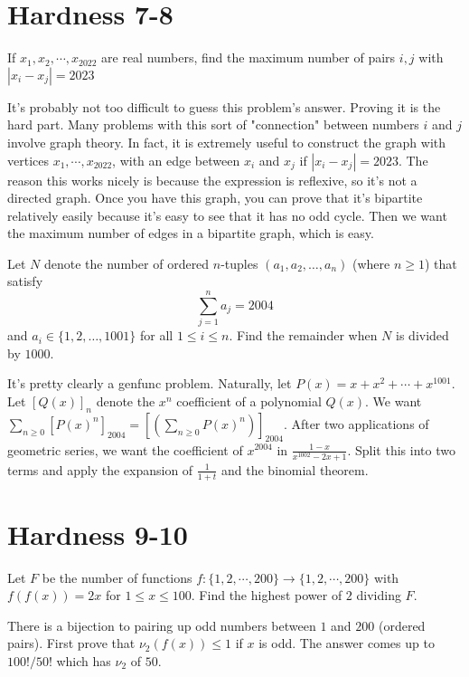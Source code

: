 \documentclass[11pt]{scrartcl}
\begin{document}
\section{Hardness 7-8}
\begin{example}
  If $x_1, x_2, \cdots, x_{2022}$ are real numbers, find the maximum number of pairs $i,j$ with $|x_i-x_j|=2023$
\end{example}
\begin{soln}
  It's probably not too difficult to guess this problem's answer. Proving it is the hard part.
  Many problems with this sort of "connection" between numbers $i$ and $j$ involve graph theory.
  In fact, it is extremely useful to construct the graph with vertices $x_1, \cdots, x_{2022}$,
  with an edge between $x_i$ and $x_j$ if $|x_i-x_j|=2023$. The reason this works nicely is because the
  expression is reflexive, so it's not a directed graph. Once you have this graph, you can prove that
  it's bipartite relatively easily because it's easy to see that it has no odd cycle.
  Then we want the maximum number of edges in a bipartite graph, which is easy.
\end{soln}
\begin{example}
  Let $N$ denote the number of ordered $n$-tuples $(a_1, a_2, …, a_{n})$ (where $n \geq 1$) that satisfy
$$\sum_{j=1}^{n} a_j = 2004$$and $a_i \in \{1, 2, …, 1001\}$ for all $1 \leq i\leq n$. Find the remainder when $N$ is divided by $1000$.
\end{example}
\begin{soln}
  It's pretty clearly a genfunc problem. Naturally, let $P(x)=x+x^2+\cdots+x^{1001}$. Let $[Q(x)]_n$ denote the $x^n$ coefficient of a polynomial $Q(x)$. We want $\sum_{n\ge 0}[P(x)^n]_{2004}=\left[\left(\sum_{n\ge 0} P(x)^n\right)\right]_{2004}$. After two applications of geometric series, we want the coefficient of $x^{2004}$ in $\frac{1-x}{x^{1002}-2x+1}$. Split this into two terms and apply the expansion of $\frac{1}{1+t}$ and the binomial theorem.
\end{soln}
\newpage
\section{Hardness 9-10}
\begin{example}
  Let $F$ be the number of functions $f: \{1, 2, \cdots, 200 \} \rightarrow \{1, 2, \cdots, 200 \}$ with $f(f(x)) = 2x$ for $1\leq x \leq 100$. Find the highest power of $2$ dividing $F$.
\end{example}
\begin{soln}
  There is a bijection to pairing up odd numbers between $1$ and $200$ (ordered pairs). First prove that $\nu_2(f(x))\le 1$ if $x$ is odd.
  The answer comes up to $100!/50!$ which has $\nu_2$ of $50$.
\end{soln}
\end{document}
